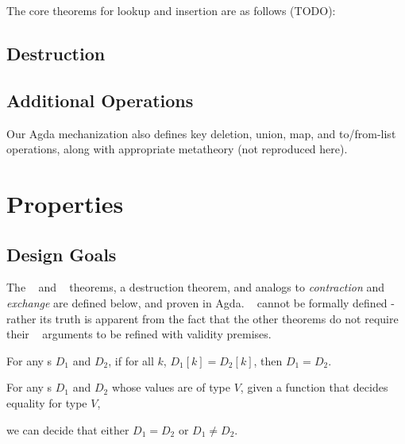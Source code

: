 The core theorems for lookup and insertion are as follows (TODO):

\subsection{Destruction}


\subsection{Additional Operations}

Our Agda mechanization also defines key deletion, union, map, and to/from-list operations, along
with appropriate metatheory (not reproduced here).



\section{Properties}
\label{sec:DD:props}

\subsection{Design Goals}

The \SemInj~ and \EqDec~ theorems, a destruction theorem, and analogs to \emph{contraction} and
\emph{exchange} are defined below, and proven in Agda. \SemTot~ cannot be formally defined - rather
its truth is apparent from the fact that the other theorems do not require their \dd~ arguments to
be refined with validity premises.

\begin{proposition}[\SemTot]

\breakAndIndent
%

\end{proposition}

\begin{theorem}[\SemInj]
\label{thm:SemInj}

\breakAndIndent
%
For any {\dd}s $D_1$ and $D_2$,
%
if for all $k$, $D_1[k] = D_2[k]$,
%
then $D_1 = D_2$.

\end{theorem}

\begin{theorem}[\EqDec]
\label{thm:EqDec}

\breakAndIndent
%
For any {\dd}s $D_1$ and $D_2$ whose values are of type $V$,
%
given a function that decides equality for type $V$,
%

\justIndent
%
we can decide that either $D_1 = D_2$ or $D_1 \ne D_2$.

\end{theorem}

